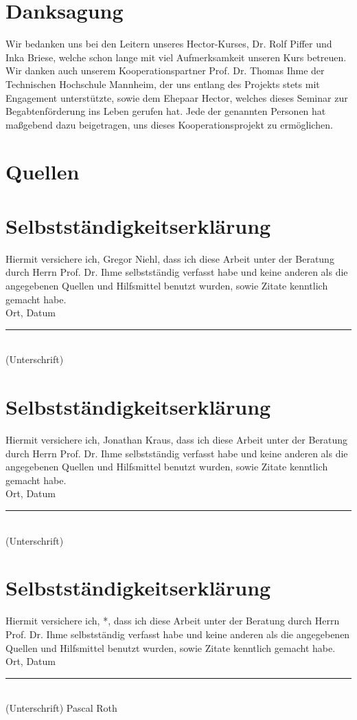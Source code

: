 \section*{Danksagung}
\label{sec:schlussteil}

Wir bedanken uns bei den Leitern unseres Hector-Kurses, Dr. Rolf Piffer und Inka Briese, welche schon lange mit viel Aufmerksamkeit unseren Kurs betreuen. Wir danken auch unserem Kooperationspartner Prof. Dr. Thomas Ihme der Technischen Hochschule Mannheim, der uns entlang des Projekts stets mit Engagement unterstützte, sowie dem Ehepaar Hector, welches dieses Seminar zur Begabtenförderung ins Leben gerufen hat. Jede der genannten Personen hat maßgebend dazu beigetragen, uns dieses Kooperationsprojekt zu ermöglichen.



\section*{Quellen}
\bib
\appendix

\newcommand{\selbststaendigkeitserklaerung}[1]{
	\newpage
	\section*{Selbstständigkeitserklärung}
	Hiermit versichere ich, {#1}, dass ich diese Arbeit unter der Beratung durch Herrn Prof. Dr. Ihme selbstständig verfasst habe und keine anderen als die angegebenen Quellen und Hilfsmittel benutzt wurden, sowie Zitate kenntlich gemacht habe. \\[2cm]

	Ort, Datum \hfill \rule{5cm}{0.4pt} \\
	\hfill (Unterschrift)
}

\selbststaendigkeitserklaerung{Gregor Niehl}
\selbststaendigkeitserklaerung{Jonathan Kraus}
\selbststaendigkeitserklaerung*{Pascal Roth}
